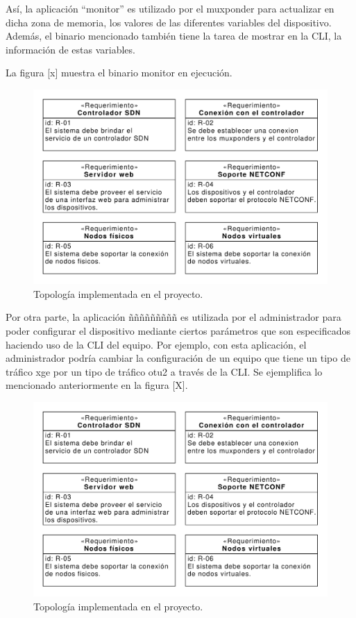 Así, la aplicación “monitor” es utilizado por el muxponder para actualizar en dicha zona de memoria, los valores de las diferentes variables del dispositivo. Además, el binario mencionado también tiene la tarea de mostrar en la CLI, la información de estas variables. 

La figura [x] muestra el binario monitor en ejecución.

\begin{figure}[H]
    \centering
    \includegraphics[scale=0.65]{Figures/req_sys.pdf}
    \caption{Topología implementada en el proyecto.}
    \label{fig:req_sys}
  \end{figure}

  Por otra parte, la aplicación ñññññññññ es utilizada por el administrador para poder configurar el dispositivo mediante ciertos parámetros que son especificados haciendo uso de la CLI del equipo. Por ejemplo, con esta aplicación, el administrador podría cambiar la configuración de un equipo que tiene un tipo de tráfico xge por un tipo de tráfico otu2 a través de la CLI. Se ejemplifica lo mencionado anteriormente en la figura [X].

  \begin{figure}[H]
    \centering
    \includegraphics[scale=0.65]{Figures/req_sys.pdf}
    \caption{Topología implementada en el proyecto.}
    \label{fig:req_sys}
  \end{figure}


